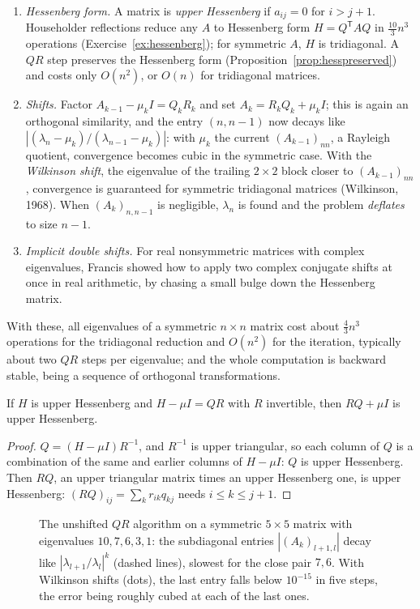\begin{enumerate}
\item \emph{Hessenberg form.} A matrix is \emph{upper Hessenberg} if $a_{ij}=0$ for $i>j+1$. Householder reflections reduce any $A$ to Hessenberg form
$H=Q^{\mathsf T}AQ$ in $\frac{10}3n^3$ operations (Exercise~\ref{ex:hessenberg}); for symmetric $A$, $H$ is tridiagonal. A $QR$ step preserves the
Hessenberg form (Proposition~\ref{prop:hesspreserved}) and costs only $O(n^2)$, or $O(n)$ for tridiagonal matrices.
\item \emph{Shifts.} Factor $A_{k-1}-\mu_kI=Q_kR_k$ and set $A_k=R_kQ_k+\mu_kI$; this is again an orthogonal similarity, and the entry $(n,n-1)$ now decays like
$|(\lambda_n-\mu_k)/(\lambda_{n-1}-\mu_k)|$: with $\mu_k$ the current $(A_{k-1})_{nn}$, a Rayleigh quotient, convergence becomes cubic in the symmetric case. With
the \emph{Wilkinson shift}, the eigenvalue of the trailing $2\times2$ block closer to $(A_{k-1})_{nn}$, convergence is guaranteed for symmetric tridiagonal
matrices (Wilkinson, 1968). When $(A_k)_{n,n-1}$ is negligible, $\lambda_n$ is found and the problem \emph{deflates} to size $n-1$.
\item \emph{Implicit double shifts.} For real nonsymmetric matrices with complex eigenvalues, Francis showed how to apply two complex conjugate shifts at
once in real arithmetic, by chasing a small bulge down the Hessenberg matrix.
\end{enumerate}

With these, all eigenvalues of a symmetric $n\times n$ matrix cost about $\frac43n^3$ operations for the tridiagonal reduction and $O(n^2)$ for the
iteration, typically about two $QR$ steps per eigenvalue; and the whole computation is backward stable, being a sequence of orthogonal transformations.

\begin{proposition}\label{prop:hesspreserved}
If $H$ is upper Hessenberg and $H-\mu I=QR$ with $R$ invertible, then $RQ+\mu I$ is upper Hessenberg.
\end{proposition}
\begin{proof}
$Q=(H-\mu I)R^{-1}$, and $R^{-1}$ is upper triangular, so each column of $Q$ is a combination of the same and earlier columns of $H-\mu I$: $Q$ is upper
Hessenberg. Then $RQ$, an upper triangular matrix times an upper Hessenberg one, is upper Hessenberg: $(RQ)_{ij}=\sum_kr_{ik}q_{kj}$ needs $i\le k\le j+1$.
\end{proof}

\begin{figure}[ht]
\centering
{}
\caption{The unshifted $QR$ algorithm on a symmetric $5\times5$ matrix with eigenvalues $10,7,6,3,1$: the subdiagonal entries $|(A_k)_{l+1,l}|$ decay
like $|\lambda_{l+1}/\lambda_l|^k$ (dashed lines), slowest for the close pair $7,6$. With Wilkinson shifts (dots), the last entry falls below $10^{-15}$
in five steps, the error being roughly cubed at each of the last ones.}
\label{fig:qrconv}
\end{figure}

